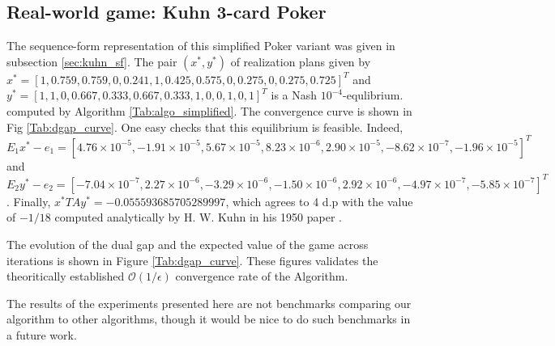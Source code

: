 \documentclass{article} %
\begin{document}
\subsection{Real-world game: Kuhn 3-card Poker}
The sequence-form representation of this simplified Poker variant was given in subsection \ref{sec:kuhn_sf}. The pair $(x^*, y^*)$ of realization plans given by
$x^* = [1, 0.759, 0.759, 0, 0.241, 1, 0.425, 0.575, 0, 0.275, 0, 0.275, 0.725]^T$ and
$y^* = [1, 1, 0, 0.667, 0.333, 0.667, 0.333, 1, 0, 0, 1, 0, 1]^T$ is a Nash $10^{-4}$-equlibrium.
computed by Algorithm  \ref{Tab:algo_simplified}. The convergence curve is shown in Fig \ref{Tab:dgap_curve}. One easy checks that this equilibrium is feasible. Indeed,  $E_1x^* - e_1 = [4.76 \times 10^{-5}, -1.91 \times 10^{-5}, 5.67 \times 10^{-5}, 8.23 \times 10^{-6}, 2.90 \times 10^{-5}, -8.62 \times 10^{-7}, -1.96 \times 10^{-5}]^T$ and $E_2y^* - e_2 = [-7.04 \times 10^{-7}, 2.27 \times 10^{-6}, -3.29 \times 10^{-6}, -1.50 \times 10^{-6}, 2.92 \times 10^{-6}, -4.97 \times 10^{-7}, -5.85 \times 10^{-7}]^T$. Finally, $x^*TAy^* = -0.055593685705289997$, which agrees to 4 d.p with the value of $-1 / 18$ computed analytically by H. W. Kuhn in his 1950 paper \cite{kuhn}.

The evolution of the dual gap and the expected value of the game across iterations is shown in Figure \ref{Tab:dgap_curve}. These figures validates the theoritically established $\mathcal{O}(1/\epsilon)$ convergence rate of the Algorithm.


The results of the experiments presented here are not benchmarks comparing our algorithm to other algorithms, though it would be nice to do such benchmarks in a future work.
\end{document}
